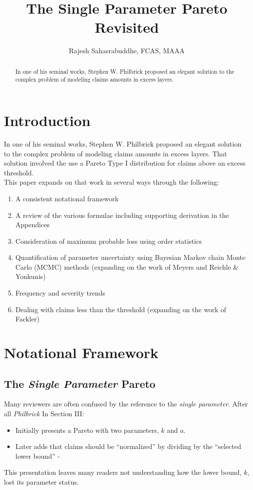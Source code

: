 \documentclass[]{article} %
\title{The Single Parameter Pareto Revisited}
\author{Rajesh Sahasrabuddhe, FCAS, MAAA}
\begin{document}
\maketitle

\begin{abstract}
In one of his seminal works, Stephen W. Philbrick proposed an elegant solution to the complex problem of modeling claims amounts in excess layers. 

\end{abstract}

\section{Introduction}
In one of his seminal works, Stephen W. Philbrick\cite{Philbrick} proposed an elegant solution to the complex problem of modeling claims amounts in excess layers. That solution involved the use a Pareto Type I distribution for claims above an excess threshold.\\

This paper expands on that work in several ways through the following:
\begin{enumerate}
\item A consistent notational framework
\item A review of the various formulae including supporting derivation in the Appendices
\item Consideration of maximum probable loss using order statistics
\item Quantification of parameter uncertainty using Bayesian Markov chain Monte Carlo (MCMC) methods (expanding on the work of Meyers and Reichle \& Yonkunis)
\item Frequency and severity trends
\item Dealing with claims less than the threshold (expanding on the work of Fackler)
\end{enumerate}
\section{Notational Framework}
\subsection{The \emph{Single Parameter} Pareto}
Many reviewers are often confused by the reference to the \emph{single parameter}. After all \emph{Philbrick} In Section III:
\begin{itemize}
\item Initially presents a Pareto with two parameters, $k$ and $a$.
\item Later adds that claims should be ``normalized'' by dividing by the ``selected lower bound'' - 
\end{itemize}
This presentation leaves many readers not understanding how the lower bound, $k$,  lost its parameter status. 
\end{document}

